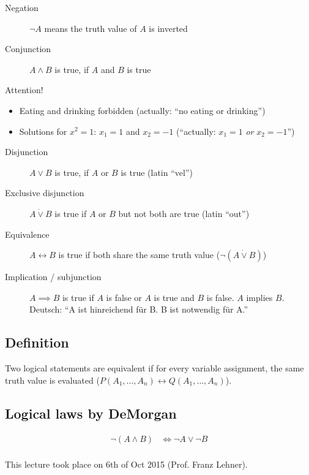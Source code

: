 \documentclass[a4paper,landscape,twocolumn]{article}
\newcommand\meta[3]{This #1 took place on #2 (#3).\par}
\begin{document}
\begin{description}
  \item[Negation]
    $\neg A$ means the truth value of $A$ is inverted
  \item[Conjunction]
    $A \land B$ is true, if $A$ and $B$ is true
\end{description}

Attention!
\begin{itemize}
  \item Eating and drinking forbidden (actually: \enquote{no eating or drinking})
  \item Solutions for $x^2 = 1$: $x_1 = 1$ and $x_2 = -1$ (\enquote{actually: $x_1 = 1$ \emph{or} $x_2 = -1$})
\end{itemize}

\begin{description}
  \item[Disjunction]
    $A \lor B$ is true, if $A$ or $B$ is true (latin \enquote{vel})
  \item[Exclusive disjunction]
    $A \dot\lor B$ is true if $A$ or $B$ but not both are true (latin \enquote{out})
  \item[Equivalence]
    $A \leftrightarrow B$ is true if both share the same truth value ($\neg (A \dot\lor B)$)
  \item[Implication / subjunction]
    $A \implies B$ is true if $A$ is false or $A$ is true and $B$ is false.
    $A$ implies $B$. Deutsch: \enquote{A ist hinreichend für B. B ist notwendig für A.}
\end{description}

\subsection{Definition}

Two logical statements are equivalent if for every variable assignment,
the same truth value is evaluated ($P(A_1, \ldots, A_n) \leftrightarrow Q(A_1, \ldots, A_n)$).

\subsection{Logical laws by DeMorgan}

\begin{align*}
  \neg(A \land B) &\Leftrightarrow \neg A \lor \neg B \\
\end{align*}

\meta{lecture}{6th of Oct 2015}{Prof. Franz Lehner}
\end{document}
